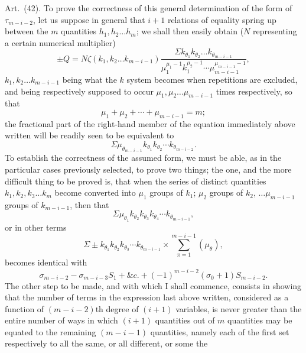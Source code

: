 \documentclass[11pt]{article}
\newcommand{\art}[1]{\par\smallskip\noindent Art.~(#1).\quad}
\begin{document}
\art{42} To prove the correctness of this general determination of the form of $\tau_{m-i-2}$, let us suppose in general that $i+1$ relations of equality spring up between the $m$ quantities $h_1,h_2\ldots h_m$; we shall then easily obtain ($N$ representing a certain numerical multiplier)
\[
\pm Q=N\zeta(k_1,k_2\ldots k_{m-i-1})
\frac{\Sigma k_{\theta_1}k_{\theta_2}\ldots k_{\theta_{m-i-1}}}
{\mu_1^{\mu_1-1}k_1^{\mu_2-1}\cdots\mu_{m-i-1}^{\mu_{m-i-1}-1}},
\]
$k_1,k_2\ldots k_{m-i-1}$ being what the $k$ system becomes when repetitions are excluded, and being respectively supposed to occur $\mu_1,\mu_2\ldots\mu_{m-i-1}$ times respectively, so that
\[
\mu_1+\mu_2+\cdots+\mu_{m-i-1}=m;
\]
the fractional part of the right-hand member of the equation immediately above written will be readily seen to be equivalent to
\[
\Sigma\mu_{\theta_{m-i-1}}k_{\theta_1}k_{\theta_2}\cdots k_{\theta_{m-i-2}}.
\]
To establish the correctness of the assumed form, we must be able, as in the particular cases previously selected, to prove two things; the one, and the more difficult thing to be proved is, that when the series of distinct quantities $k_1,k_2,k_3\ldots k_m$ become converted into $\mu_1$ groups of $k_1$; $\mu_2$ groups of $k_2$, $\ldots\mu_{m-i-1}$ groups of $k_{m-i-1}$, then that
\[
\Sigma\mu_{\theta_1}k_{\theta_2}k_{\theta_3}k_{\theta_4}\cdots k_{\theta_{m-i-1}},
\]
or in other terms
\[
\Sigma\pm k_{\theta_1}k_{\theta_2}k_{\theta_3}\cdots k_{\theta_{m-i-1}}\times
\sum_{\pi=1}^{m-i-1}(\mu_\theta),
\]
becomes identical with
\[
\sigma_{m-i-2}-\sigma_{m-i-3}S_1+\&c.+(-1)^{m-i-2}(\sigma_0+1)S_{m-i-2}.
\]
The other step to be made, and with which I shall commence, consists in showing that the number of terms in the expression last above written, considered as a function of $(m-i-2)$th degree of $(i+1)$ variables, is never greater than the entire number of ways in which $(i+1)$ quantities out of $m$ quantities may be equated to the remaining $(m-i-1)$ quantities, namely each of the first set respectively to all the same, or all different, or some the
\end{document}
